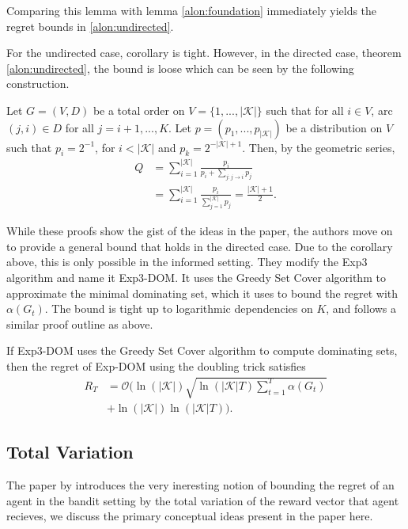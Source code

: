 Comparing this lemma with lemma \ref{alon:foundation} immediately yields the regret bounds in \ref{alon:undirected}.

For the undirected case, corollary \label{alon:corollary} is tight. However, in the directed case, theorem \ref{alon:undirected}, the bound is loose which can be seen by the following construction. 

\begin{corollary}
	Let $G=(V,D)$ be a total order on $V=\{1,...,|\mathcal{K}|\}$ such that for all $i\in V$, arc $(j,i)\in D$ for all $j=i+1,...,K$. Let $p=(p_1,...,p_{|\mathcal{K}|})$ be a distribution on $V$ such that $p_i=2^{-1}$, for $i< |\mathcal{K}|$ and $p_k=2^{-|\mathcal{K}|+1}$. Then, by the geometric series,
	\begin{align*}
		Q&=\sum_{i=1}^{|\mathcal{K}|}\frac{p_i}{p_i+\sum_{j:j\to i}p_j}\\
		 &=\sum_{i=1}^{|\mathcal{K}|}\frac{p_i}{\sum_{j=1}^{|\mathcal{K}|}p_j}=\frac{|\mathcal{K}|+1}{2}.
	\end{align*}
\end{corollary} 

While these proofs show the gist of the ideas in the paper, the authors move on to provide a general bound that holds in the directed case. Due to the corollary above, this is only possible in the informed setting. They modify the Exp3 algorithm and name it Exp3-DOM. It uses the Greedy Set Cover algorithm to approximate the minimal dominating set, which it uses to bound the regret with $\alpha(G_t)$. The bound is tight up to logarithmic dependencies on $K$, and follows a similar proof outline as above. 

\begin{theorem}
	If Exp3-DOM uses the Greedy Set Cover algorithm to compute dominating sets, then the regret of Exp-DOM using the doubling trick satisfies
	\begin{align*}
		R_T&=\mathcal{O}\bigg(\ln(|\mathcal{K}|)\sqrt{\ln(|\mathcal{K}| T)\sum_{t=1}^T\alpha(G_t)}\\
		&+\ln(|\mathcal{K}|)\ln(|\mathcal{K}|T)\bigg).
	\end{align*}
\end{theorem}


\subsection{Total Variation}
The paper by \citep{hazan} introduces the very ineresting notion of bounding
the regret of an agent in the bandit setting by the total variation of the reward vector 
that agent recieves, we discuss the primary conceptual ideas present in the paper here. \\

